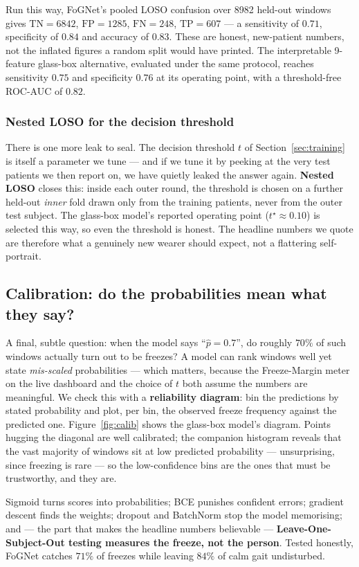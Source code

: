 Run this way, FoGNet's pooled LOSO confusion over \num{8982} held-out windows gives
$\mathrm{TN}=\num{6842}$, $\mathrm{FP}=\num{1285}$, $\mathrm{FN}=248$,
$\mathrm{TP}=607$ --- a sensitivity of $0.71$, specificity of $0.84$ and accuracy of
$0.83$. These are honest, new-patient numbers, not the inflated figures a random split
would have printed. The interpretable 9-feature glass-box alternative, evaluated under
the same protocol, reaches sensitivity $0.75$ and specificity $0.76$ at its operating
point, with a threshold-free ROC-AUC of $0.82$.

\subsubsection*{Nested LOSO for the decision threshold}

There is one more leak to seal. The decision threshold $t$ of
Section~\ref{sec:training} is itself a parameter we tune --- and if we tune it by peeking
at the very test patients we then report on, we have quietly leaked the answer again.
\textbf{Nested LOSO} closes this: inside each outer round, the threshold is chosen on a
further held-out \emph{inner} fold drawn only from the training patients, never from the
outer test subject. The glass-box model's reported operating point ($t^\star \approx
0.10$) is selected this way, so even the threshold is honest. The headline numbers we
quote are therefore what a genuinely new wearer should expect, not a flattering
self-portrait.

\subsection{Calibration: do the probabilities mean what they say?}

A final, subtle question: when the model says ``$\hat p = 0.7$'', do roughly $70\%$ of
such windows actually turn out to be freezes? A model can rank windows well yet state
\emph{mis-scaled} probabilities --- which matters, because the Freeze-Margin meter on the
live dashboard and the choice of $t$ both assume the numbers are meaningful. We check
this with a \textbf{reliability diagram}: bin the predictions by stated probability and
plot, per bin, the observed freeze frequency against the predicted one.
Figure~\ref{fig:calib} shows the glass-box model's diagram. Points hugging the diagonal
are well calibrated; the companion histogram reveals that the vast majority of windows
sit at low predicted probability --- unsurprising, since freezing is rare --- so the
low-confidence bins are the ones that must be trustworthy, and they are.

\begin{takeaway}
Sigmoid turns scores into probabilities; BCE punishes confident errors; gradient descent
finds the weights; dropout and BatchNorm stop the model memorising; and --- the part that
makes the headline numbers believable --- \textbf{Leave-One-Subject-Out testing measures
the freeze, not the person}. Tested honestly, FoGNet catches $71\%$ of freezes while
leaving $84\%$ of calm gait undisturbed.
\end{takeaway}

